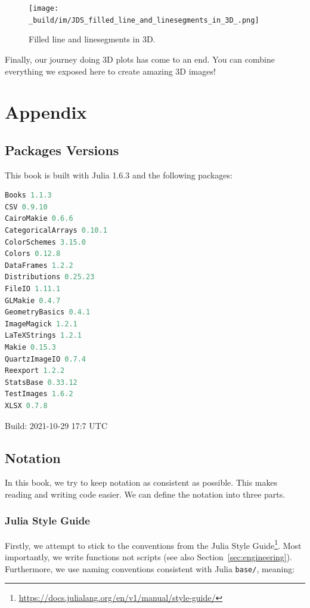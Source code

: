 \documentclass[
  notoc %
]{tufte-book}
\DeclareRobustCommand{\href}[2]{#2\footnote{\url{#1}}}
\newcommand{\passthrough}[1]{#1}
\begin{document}
\begin{figure}
\hypertarget{fig:filled_line_and_linesegments_in_3D}{%
\centering
\texttt{[image: \_build/im/JDS\_filled\_line\_and\_linesegments\_in\_3D\_.png]}
\caption{Filled line and linesegments in
3D.}\label{fig:filled_line_and_linesegments_in_3D}
}
\end{figure}

Finally, our journey doing 3D plots has come to an end. You can combine
everything we exposed here to create amazing 3D images!

\hypertarget{sec:appendix}{%
\chapter{Appendix}\label{sec:appendix}}

\hypertarget{sec:appendix_pkg}{%
\section{Packages Versions}\label{sec:appendix_pkg}}

This book is built with Julia 1.6.3 and the following packages:

\begin{lstlisting}[language=Julia]
Books 1.1.3
CSV 0.9.10
CairoMakie 0.6.6
CategoricalArrays 0.10.1
ColorSchemes 3.15.0
Colors 0.12.8
DataFrames 1.2.2
Distributions 0.25.23
FileIO 1.11.1
GLMakie 0.4.7
GeometryBasics 0.4.1
ImageMagick 1.2.1
LaTeXStrings 1.2.1
Makie 0.15.3
QuartzImageIO 0.7.4
Reexport 1.2.2
StatsBase 0.33.12
TestImages 1.6.2
XLSX 0.7.8
\end{lstlisting}

Build: 2021-10-29 17:7 UTC

\hypertarget{sec:notation}{%
\section{Notation}\label{sec:notation}}

In this book, we try to keep notation as consistent as possible. This
makes reading and writing code easier. We can define the notation into
three parts.

\hypertarget{julia-style-guide}{%
\subsection{Julia Style Guide}\label{julia-style-guide}}

Firstly, we attempt to stick to the conventions from the
\href{https://docs.julialang.org/en/v1/manual/style-guide/}{Julia Style
Guide}. Most importantly, we write functions not scripts (see also
Section~\ref{sec:engineering}). Furthermore, we use naming conventions
consistent with Julia \passthrough{\lstinline!base/!}, meaning:
\end{document}
